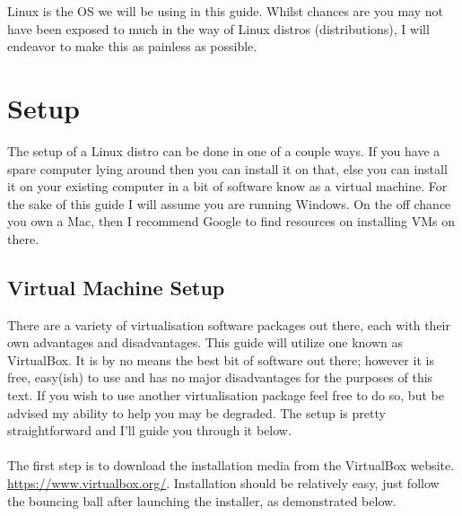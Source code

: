 \documentclass[a4paper,11pt]{report}
\begin{document}
  Linux is the OS we will be using in this guide. Whilst chances are you may not have been exposed to much in the way of Linux distros (distributions), I will endeavor to make this as painless as possible.

  \section{Setup}

  The setup of a Linux distro can be done in one of a couple ways. If you have a spare computer lying around then you can install it on that, else you can install it on your existing computer in a bit of software know as a virtual machine.
  For the sake of this guide I will assume you are running Windows. On the off chance you own a Mac, then I recommend Google to find resources on installing VMs on there.

  \subsection{Virtual Machine Setup}
    There are a variety of virtualisation software packages out there, each with their own advantages and disadvantages.
    This guide will utilize one known as VirtualBox. It is by no means the best bit of software out there; however it is free, easy(ish) to use and has no major disadvantages for the purposes of this text.
    If you wish to use another virtualisation package feel free to do so, but be advised my ability to help you may be degraded.
    The setup is pretty straightforward and I'll guide you through it below.
    \paragraph{}
    The first step is to download the installation media from the VirtualBox website. \url{https://www.virtualbox.org/}. Installation should be relatively easy, just follow the bouncing ball after launching the installer, as demonstrated below.
\end{document}
